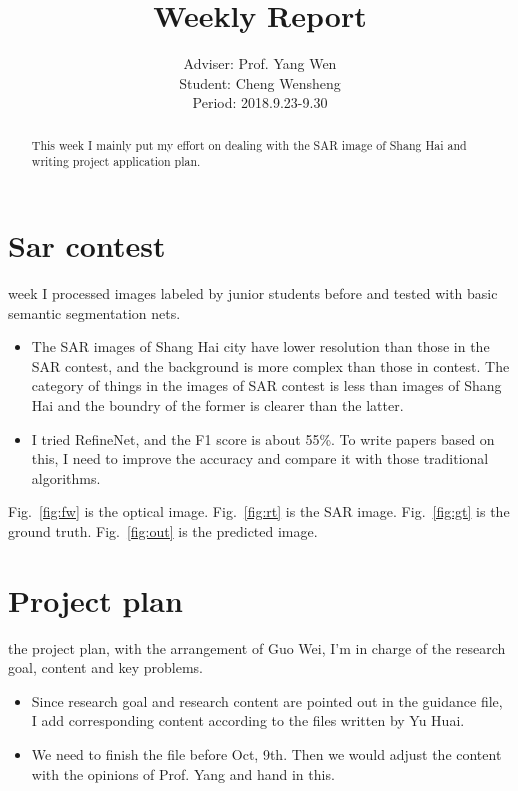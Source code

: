 \documentclass[]{IEEEtran}
\begin{document}
	\title{Weekly Report}
	\author{Adviser: Prof. Yang Wen \\Student: Cheng Wensheng\\ Period: 2018.9.23-9.30
	}
	\maketitle

\begin{abstract}
	This week I mainly put my effort on dealing with the SAR image of Shang Hai and writing project application plan.
\end{abstract}

\section{Sar contest}
	 week I processed images labeled by junior students before and tested with basic semantic segmentation nets.
	\begin{itemize}
		\item The SAR images of Shang Hai city have lower resolution than those in the SAR contest, and the background is more complex than those in contest. The category of things in the images of SAR contest is less than images of Shang Hai and the boundry of the former is clearer than the latter. 
		\item I tried RefineNet, and the F1 score is about 55\%. To write papers based on this, I need to improve the accuracy and compare it with those traditional algorithms.
		    
	\end{itemize}
	
	Fig.~\ref{fig:fw} is the optical image. Fig.~\ref{fig:rt} is the SAR image. Fig.~\ref{fig:gt} is the ground truth. Fig.~\ref{fig:out} is the predicted image.

\section{Project plan}
 the project plan, with the arrangement of Guo Wei, I'm in charge of the research goal, content and key problems.
\begin{itemize}
	\item Since research goal and research content are pointed out in the guidance file, I add corresponding content according to the files written by Yu Huai.
	\item We need to finish the file before Oct, 9th. Then we would adjust the content with the opinions of Prof. Yang and hand in this. 
	
\end{itemize}
\end{document}
